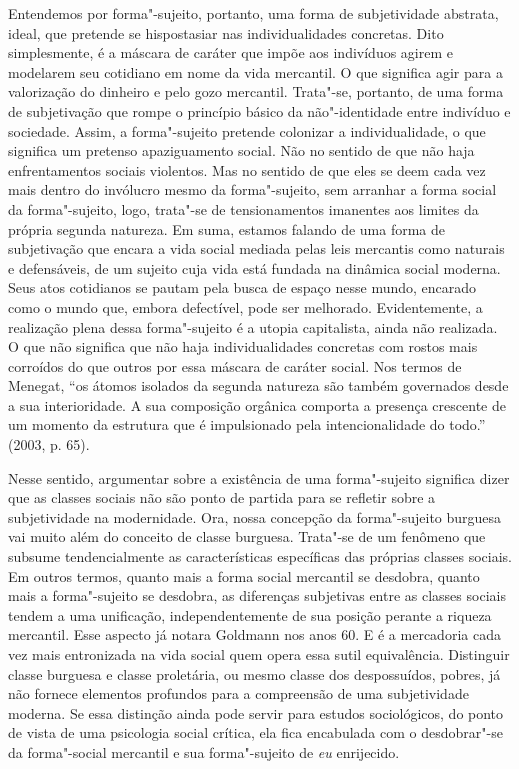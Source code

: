 Entendemos por forma"-sujeito, portanto, uma forma de subjetividade
abstrata, ideal, que pretende se hispostasiar nas individualidades
concretas. Dito simplesmente, é a máscara de caráter que impõe aos
indivíduos agirem e modelarem seu cotidiano em nome da vida mercantil. O
que significa agir para a valorização do dinheiro e pelo gozo mercantil.
Trata"-se, portanto, de uma forma de subjetivação que rompe o princípio
básico da não"-identidade entre indivíduo e sociedade. Assim, a
forma"-sujeito pretende colonizar a individualidade, o que significa um
pretenso apaziguamento social. Não no sentido de que não haja
enfrentamentos sociais violentos. Mas no sentido de que eles se deem
cada vez mais dentro do invólucro mesmo da forma"-sujeito, sem arranhar a
forma social da forma"-sujeito, logo, trata"-se de tensionamentos
imanentes aos limites da própria segunda natureza. Em suma, estamos
falando de uma forma de subjetivação que encara a vida social mediada
pelas leis mercantis como naturais e defensáveis, de um sujeito cuja
vida está fundada na dinâmica social moderna. Seus atos cotidianos se
pautam pela busca de espaço nesse mundo, encarado como o mundo que,
embora defectível, pode ser melhorado. Evidentemente, a realização plena
dessa forma"-sujeito é a utopia capitalista, ainda não realizada. O que
não significa que não haja individualidades concretas com rostos mais
corroídos do que outros por essa máscara de caráter social. Nos termos
de Menegat, ``os átomos isolados da segunda natureza são também
governados desde a sua interioridade. A sua composição orgânica comporta
a presença crescente de um momento da estrutura que é impulsionado pela
intencionalidade do todo.'' (2003, p. 65).

Nesse sentido, argumentar sobre a existência de uma forma"-sujeito
significa dizer que as classes sociais não são ponto de partida para
se refletir sobre a subjetividade na modernidade. Ora, nossa concepção
da forma"-sujeito burguesa vai muito além do conceito de classe burguesa.
Trata"-se de um fenômeno que subsume tendencialmente as características
específicas das próprias classes sociais. Em outros termos, quanto mais
a forma social mercantil se desdobra, quanto mais a forma"-sujeito se
desdobra, as diferenças subjetivas entre as classes sociais tendem a uma
unificação, independentemente de sua posição perante a riqueza
mercantil. Esse aspecto já notara Goldmann nos anos 60. E é a mercadoria
cada vez mais entronizada na vida social quem opera essa sutil
equivalência. Distinguir classe burguesa e classe proletária, ou mesmo
classe dos despossuídos, pobres, já não fornece elementos profundos para
a compreensão de uma subjetividade moderna. Se essa distinção ainda pode
servir para estudos sociológicos, do ponto de vista de uma psicologia
social crítica, ela fica encabulada com o desdobrar"-se da forma"-social
mercantil e sua forma"-sujeito de \emph{eu} enrijecido.

